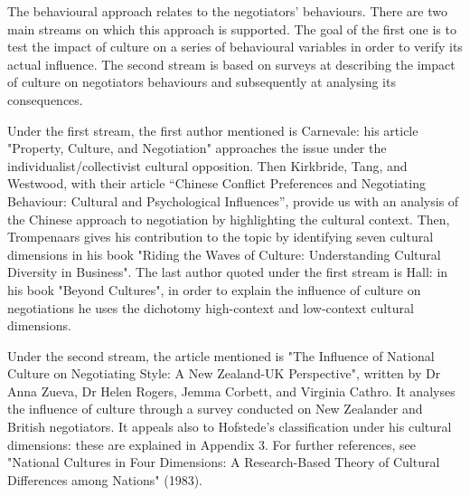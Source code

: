 \documentclass[../main.tex]{subfiles}
\begin{document}
The behavioural approach relates to the negotiators' behaviours. There are two main streams on which this approach is supported. The goal of the first one is to test the impact of culture on a series of behavioural variables in order to verify its actual influence. The second stream is based on surveys at describing the impact of culture on negotiators behaviours and subsequently at analysing its consequences.

Under the first stream, the first author mentioned is Carnevale: his article "Property, Culture, and Negotiation" approaches the issue under the individualist/collectivist cultural opposition. 
Then Kirkbride, Tang, and Westwood, with their article “Chinese Conflict Preferences and Negotiating Behaviour: Cultural and Psychological Influences”, provide us with an analysis of the Chinese approach to negotiation by highlighting the cultural context.
Then, Trompenaars gives his contribution to the topic by identifying seven cultural dimensions in his book "Riding the Waves of Culture: Understanding Cultural Diversity in Business". The last author quoted under the first stream is Hall: in his book "Beyond Cultures", in order to explain the influence of culture on negotiations he uses the dichotomy high-context and low-context cultural dimensions.

Under the second stream, the article mentioned is "The Influence of National Culture on Negotiating Style: A New Zealand-UK Perspective", written by Dr Anna Zueva, Dr Helen Rogers, Jemma Corbett, and Virginia Cathro. It analyses the influence of culture through a survey conducted on New Zealander and British negotiators. It appeals also to Hofstede's classification under his cultural dimensions: these are explained in Appendix 3. For further references, see "National Cultures in Four Dimensions: A Research-Based Theory of Cultural Differences among Nations" (1983).\\
\end{document}
